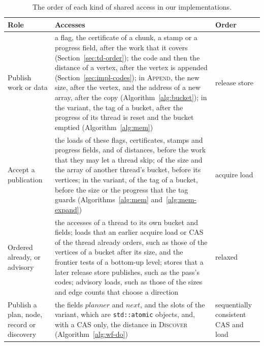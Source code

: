 \begin{table}
    \caption{The order of each kind of shared access in our implementations.}
    \label{tab:orders}
    \footnotesize
    \setlength{\tabcolsep}{3pt}
    \begin{tabular}{@{}>{\raggedright\arraybackslash}p{} >{\raggedright\arraybackslash}p{} >{\raggedright\arraybackslash}p{}@{}}
        \toprule
        Role & Accesses & Order \\
        \midrule
        Publish work or data & a flag, the certificate of a chunk, a stamp or a progress field, after the work that it covers (Section~\ref{sec:td-order}); the code and then the distance of a vertex, after the vertex is appended (Section~\ref{sec:impl-codes}); in \textsc{Append}, the new size, after the vertex, and the address of a new array, after the copy (Algorithm~\ref{alg:bucket}); in the variant, the tag of a bucket, after the progress of its thread is reset and the bucket emptied (Algorithm~\ref{alg:mem}) & release store \\
        \addlinespace
        Accept a publication & the loads of these flags, certificates, stamps and progress fields, and of distances, before the work that they may let a thread skip; of the size and the array of another thread's bucket, before its vertices; in the variant, of the tag of a bucket, before the size or the progress that the tag guards (Algorithms~\ref{alg:mem} and~\ref{alg:mem-expand}) & acquire load \\
        \addlinespace
        Ordered already, or advisory & the accesses of a thread to its own bucket and fields; loads that an earlier acquire load or CAS of the thread already orders, such as those of the vertices of a bucket after its size, and the frontier tests of a bottom-up level; stores that a later release store publishes, such as the pass's codes; advisory loads, such as those of the sizes and edge counts that choose a direction & relaxed \\
        \addlinespace
        Publish a plan, node, record or discovery & the fields $\mathit{planner}$ and $\mathit{next}$, and the slots of the variant, which are \texttt{std::atomic} objects, and, with a CAS only, the distance in \textsc{Discover} (Algorithm~\ref{alg:wf-do}) & sequentially consistent CAS and load \\
        \bottomrule
    \end{tabular}
\end{table}

